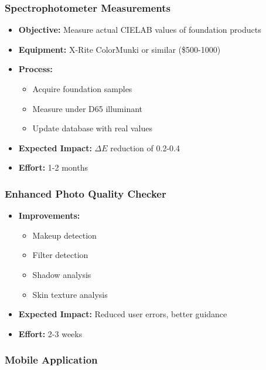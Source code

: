\subsubsection{Spectrophotometer Measurements}

\begin{itemize}
    \item \textbf{Objective:} Measure actual CIELAB values of foundation products
    \item \textbf{Equipment:} X-Rite ColorMunki or similar (\$500-1000)
    \item \textbf{Process:}
    \begin{itemize}
        \item Acquire foundation samples
        \item Measure under D65 illuminant
        \item Update database with real values
    \end{itemize}
    \item \textbf{Expected Impact:} $\Delta E$ reduction of 0.2-0.4
    \item \textbf{Effort:} 1-2 months
\end{itemize}

\subsubsection{Enhanced Photo Quality Checker}

\begin{itemize}
    \item \textbf{Improvements:}
    \begin{itemize}
        \item Makeup detection
        \item Filter detection
        \item Shadow analysis
        \item Skin texture analysis
    \end{itemize}
    \item \textbf{Expected Impact:} Reduced user errors, better guidance
    \item \textbf{Effort:} 2-3 weeks
\end{itemize}

\subsubsection{Mobile Application}

